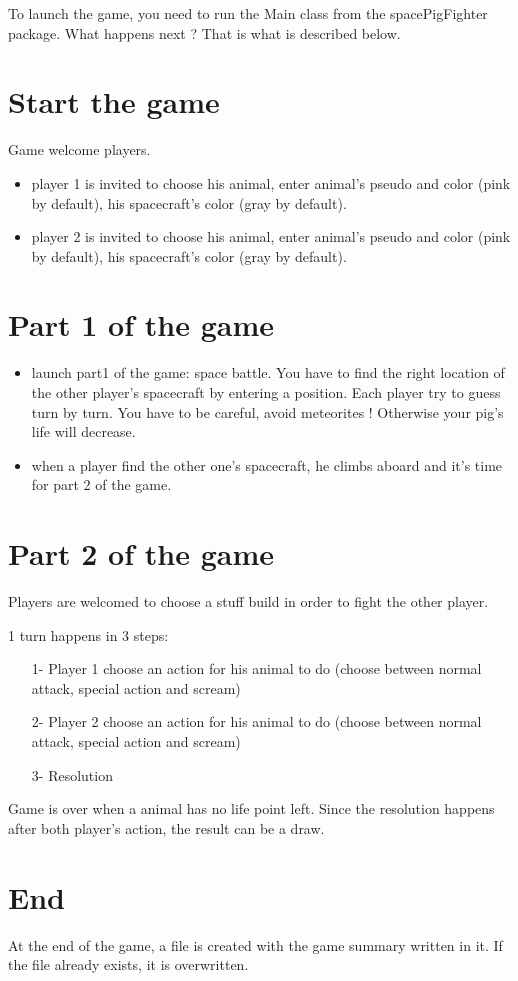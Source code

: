 To launch the game, you need to run the Main class from the spacePigFighter package.
What happens next ? That is what is described below.

\section{Start the game}
Game welcome players.

\begin{itemize}
 \item player 1 is invited to choose his animal, enter animal's pseudo and color (pink by default), his spacecraft's color (gray by default).
 \item player 2 is invited to choose his animal, enter animal's pseudo and color (pink by default), his spacecraft's color (gray by default).
\end{itemize}


\section{Part 1 of the game}

\begin{itemize}
 \item launch part1 of the game: space battle. You have to find the right location of the other player's spacecraft by entering a position. Each player try to guess turn by turn. You have to be careful, avoid meteorites ! Otherwise your pig's life will decrease.
 \item when a player find the other one's spacecraft, he climbs aboard and it's time for part 2 of the game.
\end{itemize}


\section{Part 2 of the game}

Players are welcomed to choose a stuff build in order to fight the other player.

1 turn happens in 3 steps:

\begin{itemize}
 \item[1-] Player 1 choose an action for his animal to do (choose between normal attack, special action and scream)
 \item[2-] Player 2 choose an action for his animal to do (choose between normal attack, special action and scream)
 \item[3-] Resolution
\end{itemize}

Game is over when a animal has no life point left. Since the resolution happens after both player's action, the result can be a draw.

\section{End}

At the end of the game, a file is created with the game summary written in it.
If the file already exists, it is overwritten.


